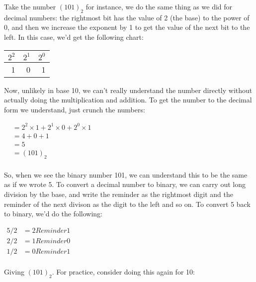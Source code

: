 Take the number $(101)_2$ for instance, we do the same thing as we did for
decimal numbers: the rightmost bit has the value of 2 (the base) to the power
of 0, and then we increase the exponent by 1 to get the value of the next bit
to the left. In this case, we'd get the following chart:

\begin{center}
  \begin{tabular}{r | r | r}
    $2^2$ & $2^1$ & $2^0$ \\
    \hline
        1 &      0 &      1 \\
  \end{tabular}
\end{center}

Now, unlikely in base 10, we can't really understand the number directly without
actually doing the multiplication and addition. To get the number to the
decimal form we understand, just crunch the numbers:

\begin{center}
  \begin{math}
    \begin{aligned}
&= 2^2 \times 1 + 2^1 \times 0 + 2^0 \times 1 \\
&= 4 + 0 + 1 \\
&= 5 \\
&= (101)_2 \\
    \end{aligned}
  \end{math}
\end{center}

So, when we see the binary number 101, we can understand this to be the same as
if we wrote 5. To convert a decimal number to binary, we can carry out long
division by the base, and write the reminder as the rightmost digit and the
reminder of the next divison as the digit to the left and so on. To convert 5
back to binary, we'd do the following:

\begin{center}
  \begin{math}
    \begin{aligned}
5/2 &= 2 Reminder 1 \\
2/2 &= 1 Reminder 0 \\
1/2 &= 0 Reminder 1 \\
    \end{aligned}
  \end{math}
\end{center}

Giving $(101)_2$. For practice, consider doing this again for 10:

